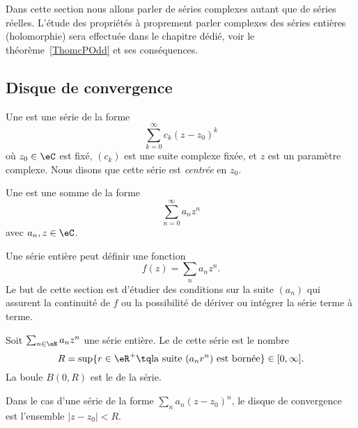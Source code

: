 Dans cette section nous allons parler de séries complexes autant que de séries réelles. L'étude des propriétés à proprement parler complexes des séries entières (holomorphie) sera effectuée dans le chapitre dédié, voir le théorème~\ref{ThomcPOdd} et ses conséquences.

\subsection{Disque de convergence}

Une  est une série de la forme
\begin{equation}		\label{eqseriepuissance}
	\sum_{k=0}^{\infty}c_k(z-z_0)^k
\end{equation}
où $z_0\in \eC$ est fixé, $(c_k)$ est une suite complexe fixée, et $z$ est un paramètre complexe. Nous disons que cette série est \emph{centrée} en $z_0$.

\begin{definition}
	Une  est une somme de la forme
	\begin{equation}
		\sum_{n=0}^{\infty}a_nz^n
	\end{equation}
	avec \( a_n,z\in\eC\).
\end{definition}
Une série entière peut définir une fonction
\begin{equation}
	f(z)=\sum_na_nz^n.
\end{equation}
Le but de cette section est d'étudier des conditions sur la suite \( (a_n)\) qui assurent la continuité de \( f\) ou la possibilité de dériver ou intégrer la série terme à terme.

\begin{definition}  \label{DefZWKOZOl}
	Soit \( \sum_{n\in \eN}a_nz^n\) une série entière. Le  de cette série est le nombre
	\begin{equation}
		R=\sup\{ r\in \eR^+\tq \text{la suite }(a_nr^n)\text{ est bornée} \}\in\mathopen[ 0 , \infty \mathclose].
	\end{equation}
	La boule \( B(0,R)\) est le  de la série.

	Dans le cas d'une série de la forme  \( \sum_n a_n(z-z_0)^n\), le disque de convergence est l'ensemble $| z-z_0 |< R$.
\end{definition}

